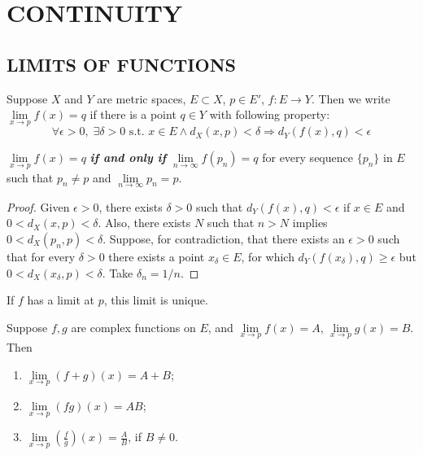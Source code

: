 \section{CONTINUITY}
\subsection{LIMITS OF FUNCTIONS}

\begin{definition}
Suppose $X$ and $Y$ are metric spaces, $E\subset X$, $p\in E'$, $f:E\to Y$.
Then we write $\lim\limits_{x\to p}f(x)=q$ if there is a point $q\in Y$ with following property:
$$\forall \epsilon>0,\; \exists \delta>0 \text{ s.t. } x\in E\land d_X(x,p)<\delta \Rightarrow d_Y(f(x),q)<\epsilon$$
\end{definition}

\begin{theorem}
$\lim\limits_{x\to p}f(x)=q$ \textbf{\emph{if and only if}} $\lim\limits_{n\to \infty}f(p_n)=q$ for every sequence $\{p_n\}$ in $E$ such that $p_n\neq p$ and $\lim\limits_{n\to \infty}p_n=p$.
\end{theorem}
\begin{proof}
\forward Given $\epsilon>0$, there exists $\delta>0$ such that $d_Y(f(x),q)<\epsilon$ if $x\in E$ and $0<d_X(x,p)<\delta$. Also, there exists $N$ such that $n>N$ implies $0<d_X(p_n,p)<\delta$.
\backward Suppose, for contradiction, that there exists an $\epsilon>0$ such that for every $\delta>0$ there exists a point $x_\delta\in E$, for which $d_Y(f(x_\delta),q)\geq \epsilon$ but $0<d_X(x_\delta,p)<\delta$. Take $\delta_n = 1/n$.
\end{proof}

\begin{corollary}
If $f$ has a limit at $p$, this limit is unique.
\end{corollary}

\begin{theorem}
Suppose $f,g$ are complex functions on $E$, and $\lim\limits_{x\to p}f(x)=A$, $\lim\limits_{x\to p}g(x)=B$. Then
\begin{enumerate}[label={(\alph*)}]
\item $\lim\limits_{x\to p}(f+g)(x) = A+B$;
\item $\lim\limits_{x\to p}(fg)(x) = AB$;
\item $\lim\limits_{x\to p}(\frac{f}{g})(x)=\frac{A}{B}$, if $B\neq 0$.
\end{enumerate}
\end{theorem}

